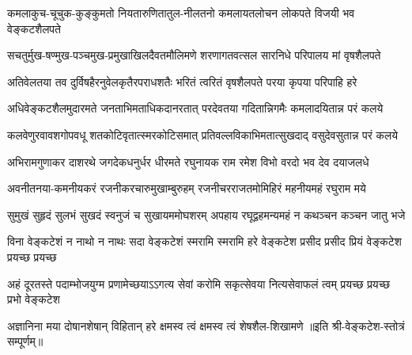 
\twolineshloka
{कमलाकुच-चूचुक-कुङ्कुमतो नियतारुणितातुल-नीलतनो}
{कमलायतलोचन लोकपते विजयी भव वेङ्कटशैलपते}

\twolineshloka
{सचतुर्मुख-षण्मुख-पञ्चमुख-प्रमुखाखिलदैवतमौलिमणे}
{शरणागतवत्सल सारनिधे परिपालय मां वृषशैलपते}

\twolineshloka
{अतिवेलतया तव दुर्विषहैरनुवेलकृतैरपराधशतैः}
{भरितं त्वरितं वृषशैलपते परया कृपया परिपाहि हरे}

\twolineshloka
{अधिवेङ्कटशैलमुदारमते जनताभिमताधिकदानरतात्}
{परदेवतया गदितान्निगमैः कमलादयितान्न परं कलये}

\twolineshloka
{कलवेणुरवावशगोपवधू शतकोटिवृतात्स्मरकोटिसमात्}
{प्रतिवल्लविकाभिमतात्सुखदाद् वसुदेवसुतान्न परं कलये}

\twolineshloka
{अभिरामगुणाकर दाशरथे जगदेकधनुर्धर धीरमते}
{रघुनायक राम रमेश विभो वरदो भव देव दयाजलधे}

\twolineshloka
{अवनीतनया-कमनीयकरं रजनीकरचारुमुखाम्बुरुहम्}
{रजनीचरराजतमोमिहिरं महनीयमहं रघुराम मये}

\twolineshloka
{सुमुखं सुहृदं सुलभं सुखदं स्वनुजं च सुखायममोघशरम्}
{अपहाय रघूद्वहमन्यमहं न कथञ्चन कञ्चन जातु भजे}

\fourlineindentedshloka
{विना वेङ्कटेशं न नाथो न नाथः}
{सदा वेङ्कटेशं स्मरामि स्मरामि}
{हरे वेङ्कटेश प्रसीद प्रसीद}
{प्रियं वेङ्कटेश प्रयच्छ प्रयच्छ}%

\fourlineindentedshloka
{अहं दूरतस्ते पदाम्भोजयुग्म}
{प्रणामेच्छयाऽऽगत्य सेवां करोमि}
{सकृत्सेवया नित्यसेवाफलं त्वम्}
{प्रयच्छ प्रयच्छ प्रभो वेङ्कटेश}

\twolineshloka
{अज्ञानिना मया दोषानशेषान् विहितान् हरे}
{क्षमस्व त्वं क्षमस्व त्वं शेषशैल-शिखामणे}
॥इति श्री-वेङ्कटेश-स्तोत्रं सम्पूर्णम्॥
